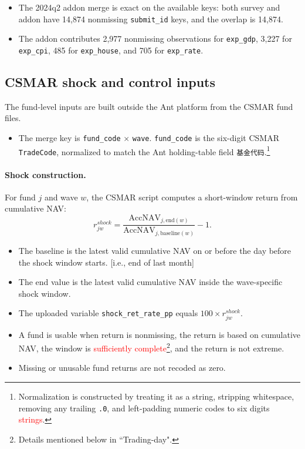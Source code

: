 \documentclass[11pt,letterpaper,english,final]{article}
\begin{document}
\begin{itemize}
\item The 2024q2 addon merge is exact on the available keys: both survey and addon have 14{,}874 nonmissing \texttt{submit\_id} keys, and the overlap is 14{,}874.
\item The addon contributes 2{,}977 nonmissing observations for \texttt{exp\_gdp}, 3{,}227 for \texttt{exp\_cpi}, 485 for \texttt{exp\_house}, and 705 for \texttt{exp\_rate}.
\end{itemize}

\subsection{CSMAR shock and control inputs}

The fund-level inputs are built outside the Ant platform from the CSMAR fund files.

\begin{itemize}
\item The merge key is \texttt{fund\_code} $\times$ \texttt{wave}. \texttt{fund\_code} is the six-digit CSMAR \texttt{TradeCode}, normalized to match the Ant holding-table field \texttt{基金代码}.\footnote{Normalization is constructed by treating it as a string, stripping whitespace, removing any trailing \texttt{.0}, and left-padding numeric codes to six digits \textcolor{red}{strings}.}
\end{itemize}

\paragraph{Shock construction.}
For fund $j$ and wave $w$, the CSMAR script computes a short-window return from cumulative NAV:
\[
r^{shock}_{jw}
= \frac{\text{AccNAV}_{j,\text{end}(w)}}{\text{AccNAV}_{j,\text{baseline}(w)}} - 1.
\]

\begin{itemize}
\item The baseline is the latest valid cumulative NAV on or before the day before the shock window starts. {\color{cyan}[i.e., end of last month]}
\item The end value is the latest valid cumulative NAV inside the wave-specific shock window.
\item The uploaded variable \texttt{shock\_ret\_rate\_pp} equals $100 \times r^{shock}_{jw}$.
\item A fund is usable when return is nonmissing, the return is based on cumulative NAV, the window is \textcolor{red}{sufficiently complete}\footnote{Details mentioned below in ``Trading-day".}, and the return is not extreme.
\item Missing or unusable fund returns are not recoded as zero.
\end{itemize}
\end{document}

